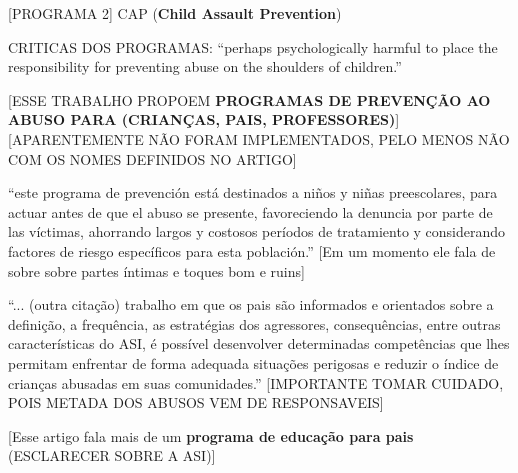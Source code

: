 [PROGRAMA 2] CAP (\textbf{Child Assault Prevention}) \cite{finkelhor2009prevention}

CRITICAS DOS PROGRAMAS: ``perhaps psychologically harmful to place the responsibility for preventing abuse on the shoulders of children.'' \cite{finkelhor2009prevention}





[ESSE TRABALHO PROPOEM \textbf{PROGRAMAS DE PREVENÇÃO AO ABUSO PARA (CRIANÇAS, PAIS, PROFESSORES)}] \cite{mariscal2003programa} [APARENTEMENTE NÃO FORAM IMPLEMENTADOS, PELO MENOS NÃO COM OS NOMES DEFINIDOS NO ARTIGO]

``este programa de prevención está destinados a niños y niñas preescolares, para actuar antes de que el abuso se presente, favoreciendo la denuncia por parte de las víctimas, ahorrando largos y costosos períodos de tratamiento y considerando factores de riesgo específicos para esta población.'' [Em um momento ele fala de sobre sobre partes íntimas e toques bom e ruins] \cite{mariscal2003programa}

``... (outra citação) trabalho  em  que  os  pais  são informados  e  orientados  sobre  a  definição,  a  frequência,  as  estratégias  dos  agressores, consequências, entre outras características do ASI, é possível desenvolver determinadas competências  que  lhes  permitam  enfrentar  de  forma  adequada  situações  perigosas  e reduzir  o  índice  de  crianças  abusadas  em  suas  comunidades.'' [IMPORTANTE TOMAR CUIDADO, POIS METADA DOS ABUSOS VEM DE RESPONSAVEIS] \cite{pinto2017avaliaccao}

[Esse artigo fala mais de um \textbf{programa de educação para pais} (ESCLARECER SOBRE A ASI)]

